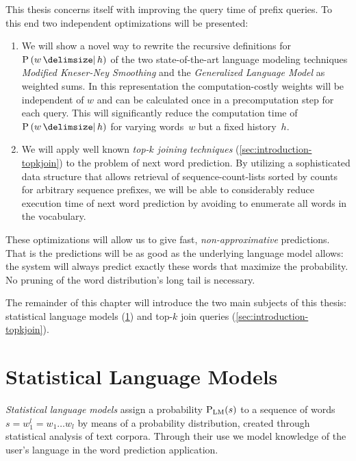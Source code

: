 This thesis concerns itself with improving the query time of prefix queries.
To this end two independent optimizations will be presented:
\begin{enumerate}
  \item We will show a novel way to rewrite the recursive definitions for
    $\Prob{w}{h}$ of the two state-of-the-art language modeling techniques
    \emph{Modified Kneser-Ney Smoothing} and the \emph{Generalized Language
    Model} as weighted sums.
    In this representation the com\-pu\-ta\-tion-costly weights will be
    independent of $w$ and can be calculated once in a precomputation step for
    each query.
    This will significantly reduce the computation time of $\Prob{w}{h}$ for
    varying words~$w$ but a fixed history~$h$.
  \item We will apply well known \emph{top-$k$ joining techniques}
    (\cref{sec:introduction-topkjoin}) to the problem of next word prediction.
    By utilizing a sophisticated data structure that allows retrieval of
    sequence-count-lists sorted by counts for arbitrary sequence prefixes,
    we will be able to considerably reduce execution time of next word
    prediction by avoiding to enumerate all words in the vocabulary.
\end{enumerate}

These optimizations will allow us to give fast, \emph{non-approximative}
predictions.
That is the predictions will be as good as the underlying language model allows:
the system will always predict exactly these words that maximize the
probability.
No pruning of the word distribution's long tail is necessary.

The remainder of this chapter will introduce the two main subjects of this
thesis: statistical language models (\cref{sec:introduction-langmodels}) and
top-$k$ join queries (\cref{sec:introduction-topkjoin}).



\section{Statistical Language Models}
\label{sec:introduction-langmodels}

\emph{Statistical language models} assign a probability $\Prob[\text{LM}]{s}$ to
a sequence of words $s = w_1^l = w_1 \ldots w_l$ by means of a probability
distribution, created through statistical analysis of text corpora.
Through their use we model knowledge of the user's language in the word
prediction application.

